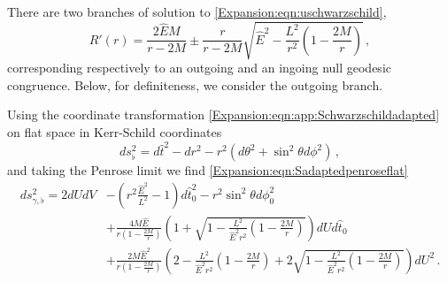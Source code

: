 	There are two branches of solution to \eqref{Expansion:eqn:uschwarzschild}, 
	\begin{equation}
	R'(r) = \frac{2 \hat{E} M}{r-2M} \pm \frac{r}{r-2M} \sqrt{ \hat{E}^2-\frac{L^2}{r^2}(1-\frac{2M}{r})} \, , 
	\end{equation}
	corresponding respectively to an outgoing and an ingoing null geodesic congruence. Below, for definiteness, we consider the outgoing branch.
	
	Using the coordinate transformation \eqref{Expansion:eqn:app:Schwarzschildadapted} on flat space in Kerr-Schild coordinates
	\begin{equation}\label{Expansion:eqn:app:SmetricKSflat}
	ds^2_{\flat} = d\hat{t}^2- dr^2-r^2 \left(d\theta^2 + \sin^2\theta d \phi^2\right)  \, ,
	\end{equation}
	and taking the Penrose limit we find \eqref{Expansion:eqn:Sadaptedpenroseflat}
	\begin{equation}\label{Expansion:eqn:app:Sadaptedpenroseflat}
	\begin{aligned}
	ds^2_{\gamma,\flat} =  
	2 dU dV&- \left(r^2 \frac{\hat{E}^2}{L^2}-1\right)d\hat{t}_0^2 - r^2 \sin^2 \theta d \phi_0^2 \\ &+ \frac{4 M \hat{E}}{r\left(1-\frac{2M}{r}\right)}\left(1+\sqrt{1-\frac{L^2}{\hat{E}^2 r^2}\left(1-\frac{2M}{r}\right)}\right)dU d\hat{t}_0 \\ &+ \frac{2M \hat{E}^2}{r\left(1-\frac{2M}{r}\right)}  \left(2-\frac{L^2}{\hat{E}^2 r^2}\left(1-\frac{2M}{r}\right)+2\sqrt{1-\frac{L^2}{\hat{E}^2 r^2}\left(1-\frac{2M}{r}\right)}\right) dU^2 \, .
	\end{aligned}
	\end{equation}
	
